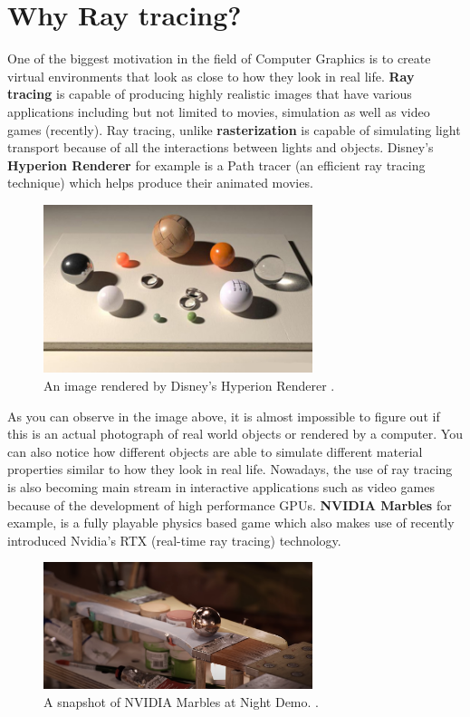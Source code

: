 \documentclass[11pt,a4paper]{article}
\begin{document}
	\section{Why Ray tracing?}
	One of the biggest motivation in the field of Computer Graphics is to create virtual environments that look as close to how they look in real life. \textbf{Ray tracing} is capable of producing highly realistic images that have various applications including but not limited to movies, simulation as well as video games (recently). Ray tracing, unlike \textbf{rasterization} is capable of simulating light transport because of all the interactions between lights and objects. Disney's \textbf{Hyperion Renderer} for example is a Path tracer (an efficient ray tracing technique) which helps produce their animated movies.
	\begin{figure}[H]
		\centering
		\includegraphics[width=0.7\textwidth]{hyperion_renderer.png}
		\caption{\centering An image rendered by Disney's Hyperion Renderer \protect\cite{burley2018design}.}
	\end{figure}
	\noindent
	As you can observe in the image above, it is almost impossible to figure out if this is an actual photograph of real world objects or rendered by a computer. You can also notice how different objects are able to simulate different material properties similar to how they look in real life. Nowadays, the use of ray tracing is also becoming main stream in interactive applications such as video games because of the development of high performance GPUs. \textbf{NVIDIA Marbles} for example, is a fully playable physics based game which also makes use of recently introduced Nvidia's RTX (real-time ray tracing) technology. 
	\begin{figure}[H]
		\centering
		\includegraphics[width=0.7\textwidth]{nvidia_marbles.png}
		\caption{\centering A snapshot of NVIDIA Marbles at Night Demo. \protect\cite{nvidiamarbles}.}
	\end{figure}
\end{document}
